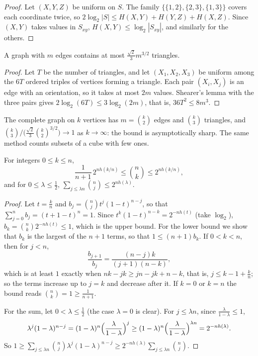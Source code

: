 \begin{proof}
Let $(X,Y,Z)$ be uniform on $S$. The family $\{\{1,2\},\{2,3\},\{1,3\}\}$ covers each coordinate twice, so $2\log_2|S|\le H(X,Y)+H(Y,Z)+H(X,Z)$. Since $(X,Y)$ takes values in $S_{xy}$, $H(X,Y)\le\log_2|S_{xy}|$, and similarly for the others.
\end{proof}

\begin{corollary}\label{cor:triangles}
A graph with $m$ edges contains at most $\frac{\sqrt2}3m^{3/2}$ triangles.
\end{corollary}

\begin{proof}
Let $T$ be the number of triangles, and let $(X_1,X_2,X_3)$ be uniform among the $6T$ ordered triples of vertices forming a triangle. Each pair $(X_i,X_j)$ is an edge with an orientation, so it takes at most $2m$ values. Shearer's lemma with the three pairs gives $2\log_2(6T)\le3\log_2(2m)$, that is, $36T^2\le8m^3$.
\end{proof}

The complete graph on $k$ vertices has $m=\binom k2$ edges and $\binom k3$ triangles, and $\binom k3\big/\bigl(\frac{\sqrt2}3\binom k2^{3/2}\bigr)\to1$ as $k\to\infty$: the bound is asymptotically sharp. The same method counts subsets of a cube with few ones.

\begin{proposition}\label{prop:binomial}
For integers $0\le k\le n$,
\[
\frac1{n+1}\,2^{nh(k/n)}\le\binom nk\le2^{nh(k/n)},
\]
and for $0\le\lambda\le\frac12$, $\sum_{j\le\lambda n}\binom nj\le2^{nh(\lambda)}$.
\end{proposition}

\begin{proof}
Let $t=\frac kn$ and $b_j=\binom nj t^j(1-t)^{n-j}$, so that $\sum_{j=0}^nb_j=(t+1-t)^n=1$. Since $t^k(1-t)^{n-k}=2^{-nh(t)}$ (take $\log_2$), $b_k=\binom nk2^{-nh(t)}\le1$, which is the upper bound. For the lower bound we show that $b_k$ is the largest of the $n+1$ terms, so that $1\le(n+1)b_k$. If $0<k<n$, then for $j<n$,
\[
\frac{b_{j+1}}{b_j}=\frac{(n-j)k}{(j+1)(n-k)},
\]
which is at least $1$ exactly when $nk-jk\ge jn-jk+n-k$, that is, $j\le k-1+\frac kn$; so the terms increase up to $j=k$ and decrease after it. If $k=0$ or $k=n$ the bound reads $\binom nk=1\ge\frac1{n+1}$.

For the sum, let $0<\lambda\le\frac12$ (the case $\lambda=0$ is clear). For $j\le\lambda n$, since $\frac\lambda{1-\lambda}\le1$,
\[
\lambda^j(1-\lambda)^{n-j}=(1-\lambda)^n\Bigl(\frac\lambda{1-\lambda}\Bigr)^j\ge(1-\lambda)^n\Bigl(\frac\lambda{1-\lambda}\Bigr)^{\lambda n}=2^{-nh(\lambda)}.
\]
So $1\ge\sum_{j\le\lambda n}\binom nj\lambda^j(1-\lambda)^{n-j}\ge2^{-nh(\lambda)}\sum_{j\le\lambda n}\binom nj$.
\end{proof}

